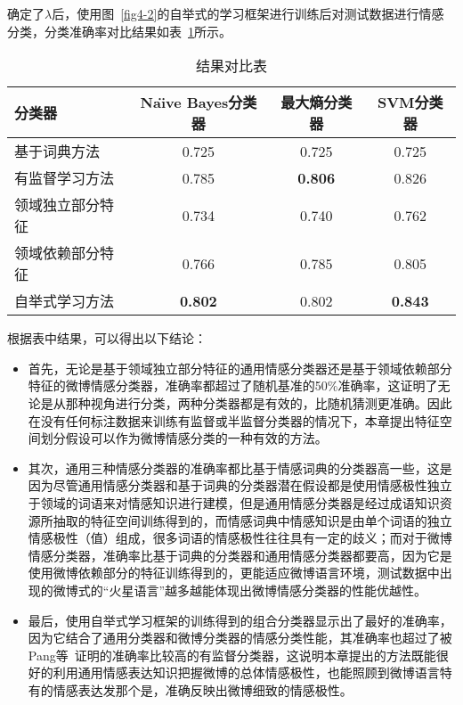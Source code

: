 确定了$ \lambda$后，使用图~\ref{fig4-2}的自举式的学习框架进行训练后对测试数据进行情感分类，分类准确率对比结果如表~\ref{tab4-1}所示。

\begin{table}[htp]
\caption{结果对比表}
\label{tab4-1}
\centering
\begin{tabular}{|l|c|c|c|}
\hline
分类器 &  Na\"\i ve Bayes分类器    &   最大熵分类器    &   SVM分类器    \\
\hline

基于词典方法 & 0.725 & 0.725 & 0.725 \\
\hline
有监督学习方法 & 0.785 & \textbf{0.806} & 0.826 \\
\hline
领域独立部分特征 & 0.734 &  0.740 & 0.762 \\
\hline
领域依赖部分特征 & 0.766 & 0.785 & 0.805 \\
\hline
自举式学习方法 & \textbf{0.802} & 0.802 & \textbf{0.843} \\
\hline
\end{tabular}
\end{table}

根据表中结果，可以得出以下结论：
\begin{itemize}
\item 首先，无论是基于领域独立部分特征的通用情感分类器还是基于领域依赖部分特征的微博情感分类器，准确率都超过了随机基准的50\%准确率，这证明了无论是从那种视角进行分类，两种分类器都是有效的，比随机猜测更准确。因此在没有任何标注数据来训练有监督或半监督分类器的情况下，本章提出特征空间划分假设可以作为微博情感分类的一种有效的方法。
\item 其次，通用三种情感分类器的准确率都比基于情感词典的分类器高一些，这是因为尽管通用情感分类器和基于词典的分类器潜在假设都是使用情感极性独立于领域的词语来对情感知识进行建模，但是通用情感分类器是经过成语知识资源所抽取的特征空间训练得到的，而情感词典中情感知识是由单个词语的独立情感极性（值）组成，很多词语的情感极性往往具有一定的歧义；而对于微博情感分类器，准确率比基于词典的分类器和通用情感分类器都要高，因为它是使用微博依赖部分的特征训练得到的，更能适应微博语言环境，测试数据中出现的微博式的“火星语言”越多越能体现出微博情感分类器的性能优越性。
\item 最后，使用自举式学习框架的训练得到的组合分类器显示出了最好的准确率，因为它结合了通用分类器和微博分类器的情感分类性能，其准确率也超过了被Pang等~证明的准确率比较高的有监督分类器，这说明本章提出的方法既能很好的利用通用情感表达知识把握微博的总体情感极性，也能照顾到微博语言特有的情感表达发那个是，准确反映出微博细致的情感极性。
\end{itemize}


